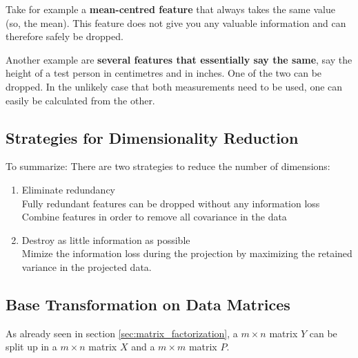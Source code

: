 \documentclass[11pt]{article}
\begin{document}
Take for example a \textbf{mean-centred feature} that always takes the same value (so, the mean). This feature does not give you any valuable information and can therefore safely be dropped.

Another example are \textbf{several features that essentially say the same}, say the height of a test person in centimetres and in inches. One of the two can be dropped. In the unlikely case that both measurements need to be used, one can easily be calculated from the other.


\subsection{Strategies for Dimensionality Reduction} \label{sec:strategies}

To summarize: There are two strategies to reduce the number of dimensions:

\begin{enumerate}
    \item Eliminate redundancy \\
          Fully redundant features can be dropped without any information loss \\
          Combine features in order to remove all covariance in the data
    \item Destroy as little information as possible \\
          Mimize the information loss during the projection by maximizing the retained variance in the projected data.
\end{enumerate}

\subsection{Base Transformation on Data Matrices}

As already seen in section \ref{sec:matrix_factorization}, a $m \times n$ matrix $Y$ can be split up in a $m \times n$ matrix $X$ and a $m \times m$ matrix $P$.
\end{document}
